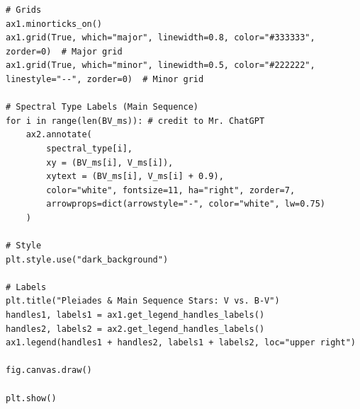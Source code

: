\documentclass[12pt]{article}
\begin{document}
\begin{minipage}{\linewidth}
\captionsetup{hypcap=false}

\begin{mintedbox}
\begin{verbatim}
# Grids
ax1.minorticks_on()
ax1.grid(True, which="major", linewidth=0.8, color="#333333", zorder=0)  # Major grid
ax1.grid(True, which="minor", linewidth=0.5, color="#222222", linestyle="--", zorder=0)  # Minor grid

# Spectral Type Labels (Main Sequence)
for i in range(len(BV_ms)): # credit to Mr. ChatGPT
    ax2.annotate(
        spectral_type[i],
        xy = (BV_ms[i], V_ms[i]),
        xytext = (BV_ms[i], V_ms[i] + 0.9),
        color="white", fontsize=11, ha="right", zorder=7,
        arrowprops=dict(arrowstyle="-", color="white", lw=0.75)
    )

# Style
plt.style.use("dark_background")

# Labels
plt.title("Pleiades & Main Sequence Stars: V vs. B-V")
handles1, labels1 = ax1.get_legend_handles_labels()
handles2, labels2 = ax2.get_legend_handles_labels()
ax1.legend(handles1 + handles2, labels1 + labels2, loc="upper right")

fig.canvas.draw()

plt.show()

\end{verbatim}
\end{mintedbox}

\end{minipage}
\end{document}
